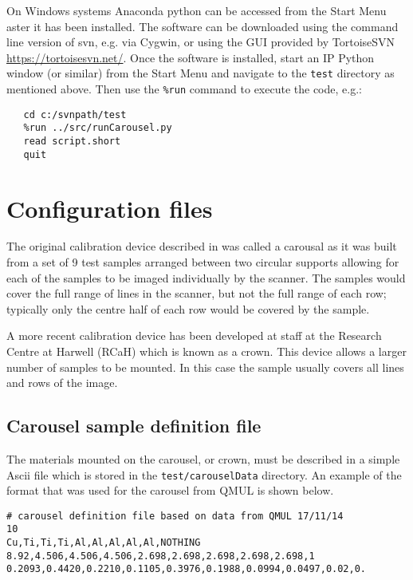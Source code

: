 \documentclass[a4paper]{article}
\begin{document}
On Windows systems Anaconda python can be accessed from the Start Menu aster it has been installed.
The software can be downloaded using the command line version of svn, e.g. via Cygwin, or using the GUI
provided by TortoiseSVN \url{https://tortoisesvn.net/}.
Once the software is installed, start an IP Python window (or similar) from the Start Menu and navigate to the 
\texttt{test} directory as mentioned above. Then use the \texttt{\%run} command to execute the code, e.g.:
\begin{verbatim}
   cd c:/svnpath/test
   %run ../src/runCarousel.py
   read script.short
   quit
\end{verbatim}

\section{Configuration files}

The original calibration device described in \cite{davis} was called a carousal as it was built from a set of 9 test samples
arranged between two circular supports allowing for each of the samples to be imaged individually by the scanner.
The samples would cover the full range of lines in the scanner, but not the full range of each row; typically only
the centre half of each row would be covered by the sample.

A more recent calibration device has been developed at staff at the Research Centre at Harwell (RCaH) which is
known as a crown. This device allows a larger number of samples to be mounted.
In this case the sample usually covers all lines and rows of the image.

\subsection{Carousel sample definition file}

The materials mounted on the carousel, or crown, must be described in a simple Ascii file which is stored
in the \texttt{test/carouselData} directory.
An example of the format that was used for the carousel from QMUL is shown below.
\begin{verbatim}
# carousel definition file based on data from QMUL 17/11/14
10
Cu,Ti,Ti,Ti,Al,Al,Al,Al,Al,NOTHING
8.92,4.506,4.506,4.506,2.698,2.698,2.698,2.698,2.698,1
0.2093,0.4420,0.2210,0.1105,0.3976,0.1988,0.0994,0.0497,0.02,0.
\end{verbatim}
\end{document}
